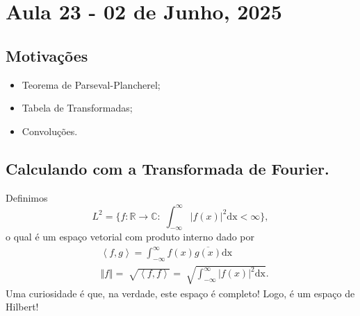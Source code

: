 \documentclass[../pde_notes.tex]{subfiles}
\begin{document}
\section{Aula 23 - 02 de Junho, 2025}
\subsection{Motivações}
\begin{itemize}
	\item Teorema de Parseval-Plancherel;
	\item Tabela de Transformadas;
	\item Convoluções.
\end{itemize}
\subsection{Calculando com a Transformada de Fourier.}
Definimos
\[
	L^{2} = \biggl\{f:\mathbb{R}\rightarrow \mathbb{C}:\; \int_{-\infty}^{\infty}|f(x)|^{2} \mathrm{dx}<\infty\biggr\},
\]
o qual é um espaço vetorial com produto interno dado por
\begin{align*}
	 & \left< f, g \right> = \int_{-\infty}^{\infty}f(x)\overline{g(x)} \mathrm{dx}                           \\
	 & \Vert f \Vert = \sqrt[]{\left< f, f \right>} = \sqrt[]{\int_{-\infty}^{\infty}|f(x)|^{2} \mathrm{dx}}.
\end{align*}
Uma curiosidade é que, na verdade, este espaço é completo! Logo, é um espaço de Hilbert!
\end{document}
